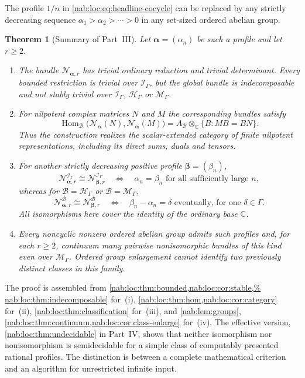 \documentclass[11pt,letterpaper]{article}
\newtheorem{theorem}{Theorem}[section]
\theoremstyle{definition}
\theoremstyle{remark}
\newcommand{\C}{\mathbb C}
\newcommand{\HH}{\mathscr H_\Gamma}
\newcommand{\II}{\mathscr I_\Gamma}
\newcommand{\MM}{\mathscr M_\Gamma}
\newcommand{\BB}{\mathscr B}
\newcommand{\Aglob}{A_{\BB}}
\newcommand{\Hom}{\operatorname{Hom}}
\newcommand{\profile}{\boldsymbol\alpha}
\newcommand{\betaprofile}{\boldsymbol\beta}
\newcommand{\NN}[1]{\mathcal N_{\profile,#1}}
\newcommand{\NNb}[1]{\mathcal N_{\betaprofile,#1}}
\numberwithin{equation}{section}
\begin{document}
The profile $1/n$ in \eqref{nab:loc:eq:headline-cocycle} can be replaced by any
strictly decreasing sequence $\alpha_1>\alpha_2>\cdots>0$ in any set-sized
ordered abelian group.

\begin{theorem}[Summary of Part~III]\label{nab:loc:thm:summary}
Let $\profile=(\alpha_n)$ be such a profile and let $r\geq2$.
\begin{enumerate}[label=\textup{(\roman*)}]
\item The bundle $\NN r$ has trivial ordinary reduction and trivial
determinant. Every bounded restriction is trivial over $\II$, but the global
bundle is indecomposable and not stably trivial over $\II$, $\HH$ or $\MM$.
\item For nilpotent complex matrices $N$ and $M$ the corresponding bundles
satisfy
\[
 \Hom_{\BB}\bigl(\mathcal N_{\profile}(N),\mathcal N_{\profile}(M)\bigr)
 =\Aglob\otimes_\C\{B:MB=BN\}.
\]
Thus the construction realizes the scalar-extended category of finite
nilpotent representations, including its direct sums, duals and tensors.
\item For another strictly decreasing positive profile
$\betaprofile=(\beta_n)$,
\[
 \NN r^{\II}\cong\NNb r^{\II}
 \quad\Longleftrightarrow\quad
 \alpha_n=\beta_n\text{ for all sufficiently large }n,
\]
whereas for $\BB=\HH$ or $\BB=\MM$,
\[
 \NN r^{\BB}\cong\NNb r^{\BB}
 \quad\Longleftrightarrow\quad
 \beta_n-\alpha_n=\delta\text{ eventually, for one }\delta\in\Gamma.
\]
All isomorphisms here cover the identity of the ordinary base $\C$.
\item Every noncyclic nonzero ordered abelian group admits such profiles and,
for each $r\geq2$, continuum many pairwise nonisomorphic bundles of this kind
even over $\MM$. Ordered group enlargement cannot identify two previously
distinct classes in this family.
\end{enumerate}
\end{theorem}

The proof is assembled from \cref{nab:loc:thm:bounded,nab:loc:cor:stable,%
nab:loc:thm:indecomposable} for~(i), \cref{nab:loc:thm:hom,nab:loc:cor:category}
for~(ii), \cref{nab:loc:thm:classification} for~(iii), and
\cref{nab:lem:groups}, \cref{nab:loc:thm:continuum,nab:loc:cor:class-enlarge}
for~(iv). The effective version, \cref{nab:loc:thm:undecidable} in Part~IV,
shows that neither isomorphism nor nonisomorphism is semidecidable for a simple
class of computably presented rational profiles. The distinction is between a
complete mathematical criterion and an algorithm for unrestricted infinite
input.
\end{document}
